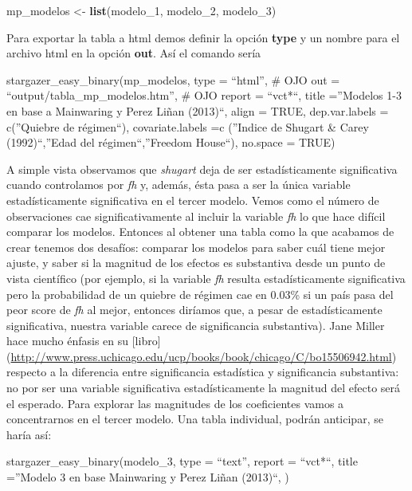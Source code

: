 \documentclass[]{book}
\newenvironment{Shaded}{\begin{snugshade}}{\end{snugshade}}
\newcommand{\KeywordTok}[1]{\textcolor[rgb]{0.13,0.29,0.53}{\textbf{#1}}}
\newcommand{\DecValTok}[1]{\textcolor[rgb]{0.00,0.00,0.81}{#1}}
\newcommand{\StringTok}[1]{\textcolor[rgb]{0.31,0.60,0.02}{#1}}
\newcommand{\NormalTok}[1]{#1}
\begin{document}
\begin{Shaded}
\begin{Highlighting}[]
\NormalTok{mp_modelos <-}\StringTok{ }\KeywordTok{list}\NormalTok{(modelo_}\DecValTok{1}\NormalTok{, }
\NormalTok{                   modelo_}\DecValTok{2}\NormalTok{,}
\NormalTok{                   modelo_}\DecValTok{3}\NormalTok{)}
\end{Highlighting}
\end{Shaded}

Para exportar la tabla a html demos definir la opción \textbf{type} y un
nombre para el archivo html en la opción \textbf{out}. Así el comando
sería

stargazer\_easy\_binary(mp\_modelos, type = ``html'', \# OJO out =
``output/tabla\_mp\_modelos.htm'', \# OJO report = ``vct*``, title
=''Modelos 1-3 en base a Mainwaring y Perez Liñan (2013)``, align =
TRUE, dep.var.labels = c(''Quiebre de régimen``), covariate.labels =c
(''Indice de Shugart \& Carey (1992)``,''Edad del régimen``,''Freedom
House``), no.space = TRUE)

A simple vista observamos que \emph{shugart} deja de ser
estadísticamente significativa cuando controlamos por \emph{fh} y,
además, ésta pasa a ser la única variable estadísticamente significativa
en el tercer modelo. Vemos como el número de observaciones cae
significativamente al incluir la variable \emph{fh} lo que hace difícil
comparar los modelos. Entonces al obtener una tabla como la que acabamos
de crear tenemos dos desafíos: comparar los modelos para saber cuál
tiene mejor ajuste, y saber si la magnitud de los efectos es substantiva
desde un punto de vista científico (por ejemplo, si la variable
\emph{fh} resulta estadísticamente significativa pero la probabilidad de
un quiebre de régimen cae en 0.03\% si un país pasa del peor score de
\emph{fh} al mejor, entonces diríamos que, a pesar de estadísticamente
significativa, nuestra variable carece de significancia substantiva).
Jane Miller hace mucho énfasis en su {[}libro{]}
(\url{http://www.press.uchicago.edu/ucp/books/book/chicago/C/bo15506942.html})
respecto a la diferencia entre significancia estadística y significancia
substantiva: no por ser una variable significativa estadísticamente la
magnitud del efecto será el esperado. Para explorar las magnitudes de
los coeficientes vamos a concentrarnos en el tercer modelo. Una tabla
individual, podrán anticipar, se haría así:

stargazer\_easy\_binary(modelo\_3, type = ``text'', report = ``vct*``,
title =''Modelo 3 en base Mainwaring y Perez Liñan (2013)``, )
\end{document}

